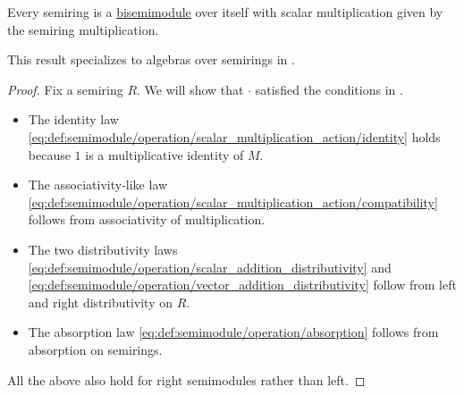 \begin{proposition}\label{thm:commutative_monoid_is_bisemimodule}
  Every semiring is a \hyperref[def:semimodule/bisemimodule]{bisemimodule} over itself with scalar multiplication given by the semiring multiplication.
\end{proposition}
\begin{comments}
  \item This result specializes to algebras over semirings in .
\end{comments}
\begin{proof}
  Fix a semiring \( R \). We will show that \( \cdot \) satisfied the conditions in .
  \begin{itemize}
    \item The identity law \eqref{eq:def:semimodule/operation/scalar_multiplication_action/identity} holds because \( 1 \) is a multiplicative identity of \( M \).
    \item The associativity-like law \eqref{eq:def:semimodule/operation/scalar_multiplication_action/compatibility} follows from associativity of multiplication.
    \item The two distributivity laws \eqref{eq:def:semimodule/operation/scalar_addition_distributivity} and \eqref{eq:def:semimodule/operation/vector_addition_distributivity} follow from left and right distributivity on \( R \).
    \item The absorption law \eqref{eq:def:semimodule/operation/absorption} follows from absorption on semirings.
  \end{itemize}

  All the above also hold for right semimodules rather than left.
\end{proof}

